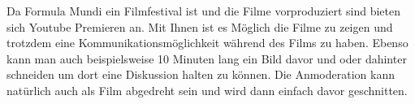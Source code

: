 \newpage
{}
Da Formula Mundi ein Filmfestival ist und die Filme vorproduziert sind bieten sich Youtube Premieren an.
Mit Ihnen ist es Möglich die Filme zu zeigen und trotzdem eine Kommunikationsmöglichkeit während des Films zu haben.
Ebenso kann man auch beispielsweise 10 Minuten lang ein Bild davor und oder dahinter schneiden um dort eine Diskussion halten zu können.
Die Anmoderation kann natürlich auch als Film abgedreht sein und wird dann einfach davor geschnitten.
